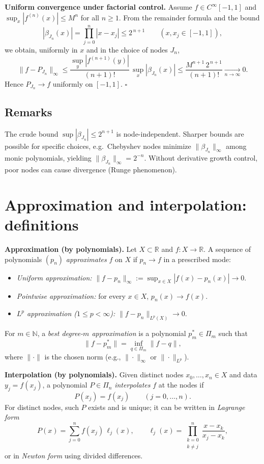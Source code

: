 \documentclass[12pt,a4paper]{article}
\newcommand{\qed}{\hfill$\square$}
\theoremstyle{plain}
\theoremstyle{definition}
\theoremstyle{remark}
\theoremstyle{remark}
\begin{document}
\bigskip

\noindent\textbf{Uniform convergence under factorial control.}
Assume $f\in C^\infty[-1,1]$ and $\sup_{x}|f^{(n)}(x)|\le M^n$ for all $n\ge1$.
From the remainder formula and the bound
\[
|\beta_{J_n}(x)|=\prod_{j=0}^{n}|x-x_j|\le 2^{\,n+1}\qquad(x,x_j\in[-1,1]),
\]
we obtain, uniformly in $x$ and in the choice of nodes $J_n$,
\[
\|f-P_{J_n}\|_{\infty}
\le \frac{\sup_{y}|f^{(n+1)}(y)|}{(n+1)!}\,\sup_{x}|\beta_{J_n}(x)|
\le \frac{M^{n+1}\,2^{\,n+1}}{(n+1)!}\xrightarrow[n\to\infty]{}0.
\]
Hence $P_{J_n}\to f$ uniformly on $[-1,1]$. \qed

\bigskip

\subsection*{Remarks}
The crude bound $\sup|\beta_{J_n}|\le 2^{n+1}$ is node-independent.
Sharper bounds are possible for specific choices, e.g.\ Chebyshev nodes minimize $\|\beta_{J_n}\|_\infty$
among monic polynomials, yielding $\|\beta_{J_n}\|_\infty=2^{-n}$.
Without derivative growth control, poor nodes can cause divergence (Runge phenomenon).

\section*{Approximation and interpolation: definitions}

\noindent\textbf{Approximation (by polynomials).}
Let $X\subset\mathbb{R}$ and $f:X\to\mathbb{R}$. A sequence of polynomials $(p_n)$
\emph{approximates} $f$ on $X$ if $p_n\to f$ in a prescribed mode:
\begin{itemize}\setlength{\itemsep}{0.4em}
	\item \emph{Uniform approximation:} $\|f-p_n\|_\infty:=\sup_{x\in X}|f(x)-p_n(x)|\to 0$.
	\item \emph{Pointwise approximation:} for every $x\in X$, $p_n(x)\to f(x)$.
	\item \emph{$L^p$ approximation ($1\le p<\infty$):} $\|f-p_n\|_{L^p(X)}\to 0$.
\end{itemize}
For $m\in\mathbb{N}$, a \emph{best degree-$m$ approximation} is a polynomial
$p_m^*\in\Pi_m$ such that
\[
\|f-p_m^*\|=\inf_{q\in\Pi_m}\|f-q\|,
\]
where $\|\cdot\|$ is the chosen norm (e.g., $\|\cdot\|_\infty$ or $\|\cdot\|_{L^p}$).

\bigskip

\noindent\textbf{Interpolation (by polynomials).}
Given distinct nodes $x_0,\dots,x_n\in X$ and data $y_j=f(x_j)$,
a polynomial $P\in\Pi_n$ \emph{interpolates} $f$ at the nodes if
\[
P(x_j)=f(x_j)\qquad (j=0,\dots,n).
\]
For distinct nodes, such $P$ exists and is unique; it can be written in
\emph{Lagrange form}
\[
P(x)=\sum_{j=0}^n f(x_j)\,\ell_j(x),\qquad
\ell_j(x)=\prod_{\substack{k=0\\ k\ne j}}^n \frac{x-x_k}{x_j-x_k},
\]
or in \emph{Newton form} using divided differences.
\end{document}
